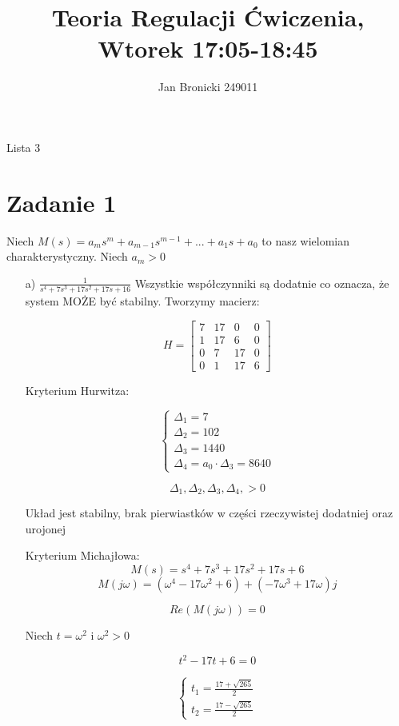 \documentclass{article}
\title{Teoria Regulacji Ćwiczenia, Wtorek 17:05-18:45}
\author{Jan Bronicki 249011 }
\date{}
\begin{document}
\maketitle


\begin{center}
    Lista 3
\end{center}

\section*{Zadanie 1}

Niech $ M(s) = a_{m}s^{m}+a_{m-1}s^{m-1} + ... + a_{1}s+a_{0}$ to nasz wielomian charakterystyczny.
Niech $a_{m}>0$

\begin{itemize}

    \item[a)] $\frac{1}{s^{4}+7s^{3}+17s^{2}+17s+16}$
    Wszystkie współczynniki są dodatnie co oznacza, że system MOŻE być stabilny.
    Tworzymy macierz:

    $$ H=
    \begin{bmatrix}
        7 & 17 & 0 & 0\\
        1 & 17 & 6 & 0\\
        0 & 7 & 17 & 0\\
        0 & 1 & 17 & 6
        \end{bmatrix}$$

    Kryterium Hurwitza:

    \[\begin{cases}
        \Delta_{1}=7\\
        \Delta_{2}=102\\
        \Delta_{3}=1440\\
        \Delta_{4}=a_{0}\cdot \Delta_{3}=8640
    \end{cases}\]

    $$ \Delta_{1}, \Delta_{2}, \Delta_{3}, \Delta_{4}, > 0 $$
    
    Układ jest stabilny, brak pierwiastków w części rzeczywistej dodatniej oraz urojonej

    Kryterium Michajłowa:
    $$M(s)=s^{4}+7s^{3}+17s^{2}+17s+6$$
    $$ M(j\omega)=(\omega^{4}-17\omega^{2}+6)+(-7\omega^{3}+17\omega)j $$

    $$ Re(M(j\omega))=0 $$

    Niech $t=\omega^{2} $ i $ \omega^{2}>0$

    $$t^{2}-17t+6=0$$

    \[\begin{cases}
        t_{1}=\frac{17+\sqrt{265}}{2}
        \\
        t_{2}=\frac{17-\sqrt{265}}{2}
    \end{cases}\]


\end{itemize}
\end{document}

